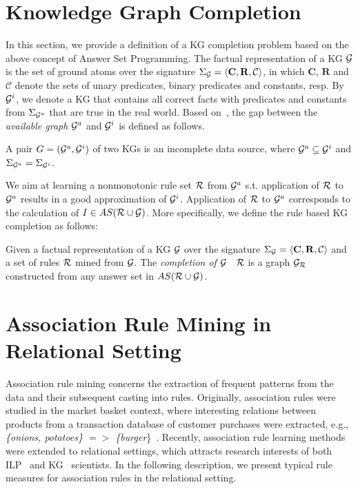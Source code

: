 \section{Knowledge Graph Completion}

In this section, we provide a definition of a KG completion problem based on the above concept of Answer Set Programming. The factual representation of a KG $\mathcal{G}$ is the set of ground atoms over the signature $\Sigma_{\mathcal{G}}=\langle\mathbf{C},\mathbf{R},\mathcal{C}\rangle$, in which $\mathbf{C}$, $\mathbf{R}$ and $\mathcal{C}$ denote the sets of unary predicates, binary predicates and constants, resp. By $\mathcal{G}^i$, we denote a KG that contains all correct facts with predicates and constants from $\Sigma_{\mathcal{G}^a}$ that are true in the real world. Based on~\cite{ref51}, the gap between the \emph{available graph} $\mathcal{G}^a$ and $\mathcal{G}^i$ is defined as follows.

\begin{definition} A pair $G = (\mathcal{G}^a, \mathcal{G}^i)$ of two KGs is an incomplete data source, where $\mathcal{G}^a\subseteq \mathcal{G}^i$ and $\Sigma_{\mathcal{G}^a}=\Sigma_{\mathcal{G}^i}$.
\end{definition}

We aim at learning a nonmonotonic rule set $\mathcal{R}$ from $\mathcal{G}^a$ s.t. application of $\mathcal{R}$ to $\mathcal{G}^a$ results in a good approximation of $\mathcal{G}^i$. Application of $\mathcal{R}$ to $\mathcal{G}^a$ corresponds to the calculation of $I \in AS(\mathcal{R} \cup \mathcal{G})$. More specifically, we define the rule based KG completion as follows:

\begin{definition}\label{def:graphcompl}
Given a factual representation of a KG $\mathcal{G}$ over the signature $\Sigma_{\mathcal{G}}=\langle\mathbf{C},\mathbf{R},\mathcal{C}\rangle$ and a set of rules $\mathcal{R}$ mined from $\mathcal{G}$. The \emph{completion of $\mathcal{G}$ \wrt\ $\mathcal{R}$} is a graph $\mathcal{G}_{\mathcal{R}}$ constructed from any answer set in $AS(\mathcal{R} \cup \mathcal{G})$.
\end{definition}

\section{Association Rule Mining in Relational Setting}

Association rule mining concerns the extraction of frequent patterns from the data and their subsequent casting into rules. Originally, association rules were studied in the market basket context, where interesting relations between products from a transaction database of customer purchases were extracted, e.g., \textit{\{onions, potatoes\} $=>$ \{burger}\}~\cite{ref54}. Recently, association rule learning methods were extended to relational settings, which attracts research interests of both ILP~\cite{ref52} and KG~\cite{ref10} scientists. In the following description, we present typical rule measures for association rules in the relational setting.

